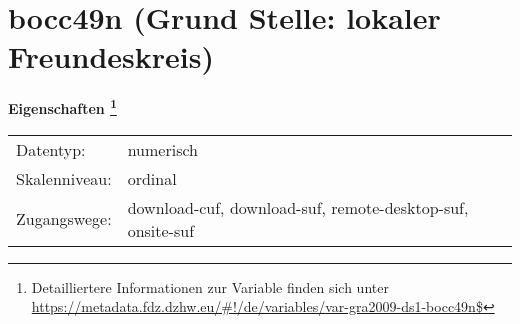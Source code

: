 
    \setcounter{footnote}{0}

    \vspace*{-1.8cm}
	\section{bocc49n (Grund Stelle: lokaler Freundeskreis)}
	\label{section:bocc49n}



    \vspace*{0.5cm}
    \noindent\textbf{Eigenschaften
	\footnote{Detailliertere Informationen zur Variable finden sich unter
		\url{https://metadata.fdz.dzhw.eu/\#!/de/variables/var-gra2009-ds1-bocc49n$}}}\\
	\begin{tabularx}{\hsize}{@{}lX}
	Datentyp: & numerisch \\
	Skalenniveau: & ordinal \\
	Zugangswege: &
	  download-cuf, 
	  download-suf, 
	  remote-desktop-suf, 
	  onsite-suf
 \\
    \end{tabularx}



